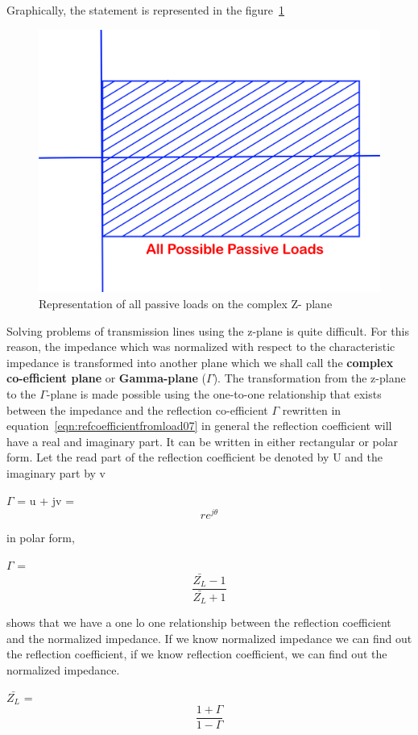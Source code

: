 Graphically, the statement is represented in the figure~\ref{fig:oigvbnkliu}
\begin{figure}[h]
\centering
\includegraphics[width=0.6\linewidth]{graphics/oigvbnkliu}
\caption{Representation of all passive loads on the complex Z- plane}
\label{fig:oigvbnkliu}
\end{figure}

Solving problems of transmission lines using the z-plane is quite difficult. For this reason, the impedance which was normalized with respect to the characteristic impedance is transformed into another plane which we shall call the \textbf{complex co-efficient plane} or \textbf{Gamma-plane} ($\Gamma$).
The transformation from the z-plane to the $\Gamma$-plane is made possible using the one-to-one relationship that exists between the impedance and the reflection co-efficient $\Gamma$ rewritten in  equation~\eqref{eqn:refcoefficientfromload07}
in general the reflection coefficient will have a real and imaginary part. It can be written in either rectangular or polar form. Let the read part of the reflection coefficient be denoted by U and the imaginary part by v

$\Gamma$ = u + jv = \[ re^{j\theta} \] 

in polar form,  

$\Gamma$ = \[ \frac{\bar{Z_L} - 1}{\bar{Z_L} + 1} \] 

shows that we have a one lo one relationship between the reflection coefficient and the normalized impedance. If we know normalized impedance we can find out the reflection coefficient, if we know reflection coefficient, we can find out the normalized impedance.

$\bar{Z_L}$ = \[ \frac{1 + \Gamma}{1 - \Gamma} \] 

